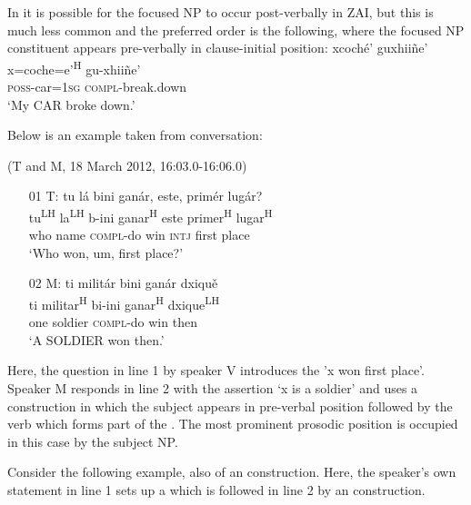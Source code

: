 In  it is possible for the focused NP to occur post-verbally in ZAI, but this is much less common and the preferred order is the following, where the focused NP constituent appears pre-verbally in clause-initial position: 
\ea 
\glll xcoch\'{e}' guxhii\~{n}e' \\
x=coche=e'\textsuperscript{H} gu-xhii\~{n}e'  \\
\textsc{poss}-car=\textsc{1sg} \textsc{compl}-break.down  \\
\glt `My CAR broke down.'
\z

Below is an example taken from conversation:

\ea(T and M, 18 March 2012, 16:03.0-16:06.0)
\begin{itemize}
\item[01 T:]
tu l\'{a} bini gan\'{a}r, este, prim\'{e}r lug\'{a}r? \\
tu\textsuperscript{LH} la\textsuperscript{LH} b-ini ganar\textsuperscript{H} este primer\textsuperscript{H} lugar\textsuperscript{H} \\
who name \textsc{compl}-do win \textsc{intj} first place  \\
\glt `Who won, um, first place?'


\item[02 M:]
\glll ti milit\'{a}r bini gan\'{a}r dxiqu\v{e} \\
ti militar\textsuperscript{H} bi-ini ganar\textsuperscript{H} dxique\textsuperscript{LH} \\
one soldier \textsc{compl}-do win then \\
\glt `A SOLDIER won then.' 


\end{itemize}
\z
Here, the question in line 1 by speaker V introduces the  'x won first place'. Speaker M responds in line 2 with the assertion `x is a soldier' and uses a construction in which the subject appears in pre-verbal position followed by the verb which forms part of the . The most prominent prosodic position is occupied in this case by the subject NP.

Consider the following example, also of an  construction. Here, the speaker's own statement in line 1 sets up a  which is followed in line 2 by an  construction.  

